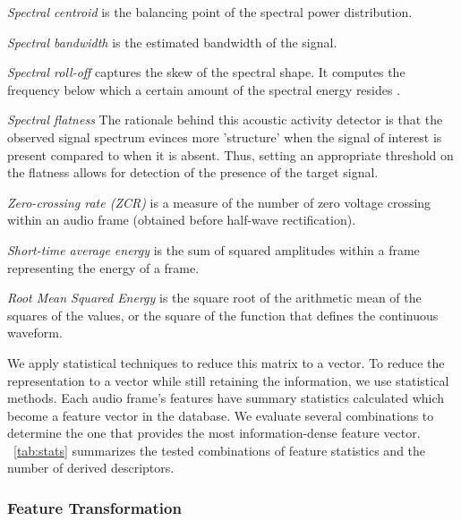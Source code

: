 \item \textit{Spectral centroid} is the balancing point of the spectral power
distribution.

\item \textit{Spectral bandwidth} is the estimated bandwidth of the signal.

\item \textit{Spectral roll-off} captures the skew of the spectral shape. It
computes the frequency below which a certain amount of the spectral energy
resides \cite{Eronen2006}.

\item \textit{Spectral flatness} The rationale behind this acoustic activity
detector is that the observed signal spectrum evinces more 'structure' when the
signal of interest is present compared to when it is absent.
%
Thus, setting an appropriate threshold on the flatness allows for detection of
the presence of the target signal.

\item \textit{Zero-crossing rate (ZCR)} is a measure of the number of zero
voltage crossing within an audio frame (obtained before half-wave
rectification).

\item \textit{Short-time average energy} is the sum of squared amplitudes 
within a frame representing the energy of a frame.

\item \textit{Root Mean Squared Energy} is the square root of the arithmetic
mean of the squares of the values, or the square of the function that defines the
continuous waveform.

\squishend

We apply statistical techniques to reduce this matrix to a vector. 
%
To reduce the representation to a vector while still retaining the information, 
we use statistical methods. 
%
Each audio frame's features have summary statistics calculated which become a 
feature vector in the database.
%
We evaluate several combinations to determine the one that provides the most
information-dense feature vector. 
%
~\cref{tab:stats} summarizes the tested combinations of feature statistics 
and the number of derived descriptors.
%

\subsubsection{Feature Transformation}
\label{sec:representation::transform}


